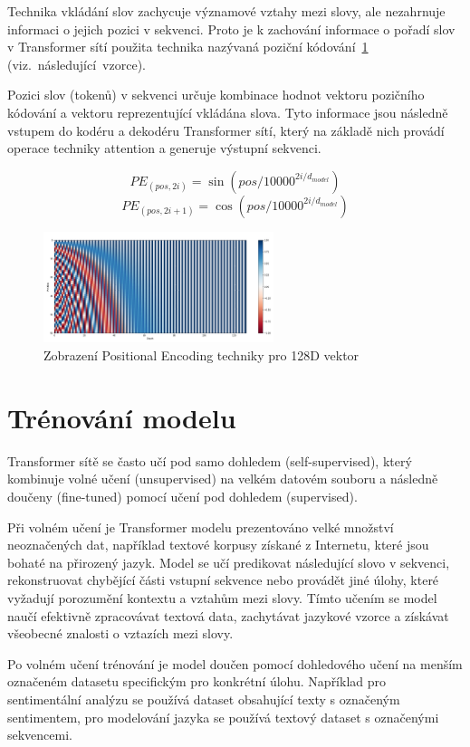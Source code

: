 Technika vkládání slov zachycuje významové vztahy mezi slovy, ale nezahrnuje informaci o jejich pozici v sekvenci.
Proto je k zachování informace o pořadí slov v Transformer sítí použita technika nazývaná poziční kódování~\ref{fig:Zobrazeni positional encodingu pro 128D vektor} (viz.~následující~vzorce).

Pozici slov (tokenů) v sekvenci určuje kombinace hodnot vektoru pozičního kódování a vektoru reprezentující vkládána slova.
Tyto informace jsou následně vstupem do kodéru a dekodéru Transformer sítí, který na základě nich provádí operace techniky attention a generuje výstupní sekvenci.

\[PE_{(pos,2i)} = \sin(pos/10000^{2i/d_{model}})\]
\[PE_{(pos,2i+1)} = \cos(pos/10000^{2i/d_{model}})\]

\begin{figure}[H]
	\centering
	\includegraphics[width=0.6\textwidth]{Figures/positional_encoding.png}
	\caption{Zobrazení Positional Encoding techniky pro 128D vektor~\cite{link38}}\label{fig:Zobrazeni positional encodingu pro 128D vektor}
\end{figure}

\section{Trénování modelu}
Transformer sítě se často učí pod samo dohledem (self-supervised), který kombinuje volné učení (unsupervised) na velkém datovém souboru a následně doučeny (fine-tuned) pomocí učení pod dohledem (supervised).

Při volném učení je Transformer modelu prezentováno velké množství neoznačených dat, například textové korpusy získané z Internetu, které jsou bohaté na přirozený jazyk.
Model se učí predikovat následující slovo v sekvenci, rekonstruovat chybějící části vstupní sekvence nebo provádět jiné úlohy, které vyžadují porozumění kontextu a vztahům mezi slovy.
Tímto učením se model naučí efektivně zpracovávat textová data, zachytávat jazykové vzorce a získávat všeobecné znalosti o vztazích mezi slovy.

Po volném učení trénování je model doučen pomocí dohledového učení na menším označeném datasetu specifickým pro konkrétní úlohu.
Například pro sentimentální analýzu se používá dataset obsahující texty s označeným sentimentem, pro modelování jazyka se používá textový dataset s označenými sekvencemi.

